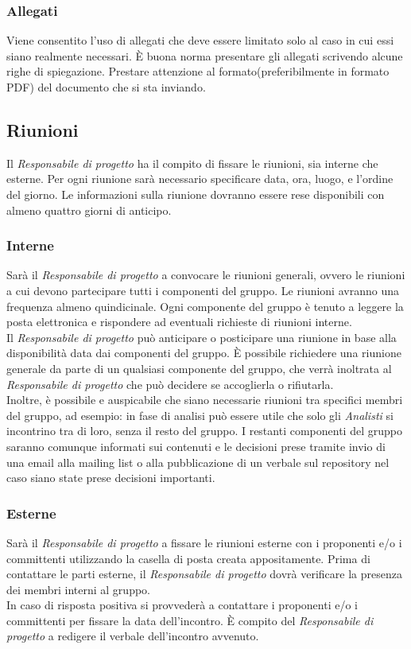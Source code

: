 		\subsubsection{Allegati}
Viene consentito l'uso di allegati che deve essere limitato solo al caso in cui essi siano realmente necessari. È buona norma presentare gli allegati scrivendo alcune righe di spiegazione. Prestare attenzione al formato(preferibilmente in formato \gls{PDF}) del documento che si sta inviando. 

	\subsection{Riunioni}
Il \textit{Responsabile di progetto} ha il compito di fissare le riunioni, sia interne che esterne. Per ogni riunione sarà necessario specificare data, ora, luogo, e l'ordine del giorno. Le informazioni sulla riunione dovranno essere rese disponibili con almeno quattro giorni di anticipo.
		\subsubsection{Interne}
Sarà il \textit{Responsabile di progetto} a convocare le riunioni generali, ovvero le riunioni a cui devono partecipare tutti i componenti del gruppo. Le riunioni avranno una frequenza almeno quindicinale. Ogni componente del gruppo è tenuto a leggere la posta elettronica e rispondere ad eventuali richieste di riunioni interne. \\
Il \textit{Responsabile di progetto} può anticipare o posticipare una riunione in base alla disponibilità data dai componenti del gruppo. È possibile richiedere una riunione generale da parte di un qualsiasi componente del gruppo, che verrà inoltrata al \textit{Responsabile di progetto} che può decidere se accoglierla o rifiutarla.\\
Inoltre, è possibile e auspicabile che siano necessarie riunioni tra specifici membri del gruppo, ad esempio: in fase di analisi può essere utile che solo gli \textit{Analisti} si incontrino tra di loro, senza il resto del gruppo. I restanti componenti del gruppo saranno comunque informati sui contenuti e le decisioni prese tramite invio di una email alla \gls{mailing list} o alla pubblicazione di un \gls{verbale} sul \gls{repository} nel caso siano state prese decisioni importanti.
		\subsubsection{Esterne}
Sarà il \textit{Responsabile di progetto} a fissare le riunioni esterne con i proponenti e/o i committenti utilizzando la casella di posta creata appositamente. Prima di contattare le parti esterne, il \textit{Responsabile di progetto} dovrà verificare la presenza dei membri interni al gruppo. \\
In caso di risposta positiva si provvederà a contattare i proponenti e/o i committenti per fissare la data dell'incontro.
È compito del \textit{Responsabile di progetto} a redigere il \gls{verbale} dell'incontro avvenuto.

